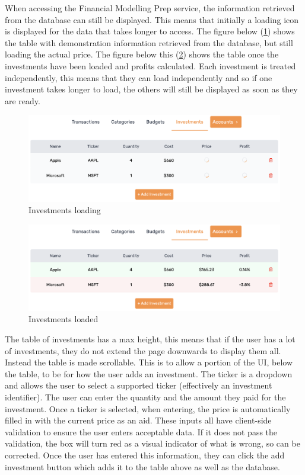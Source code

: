 When accessing the Financial Modelling Prep service, the information retrieved from the database can still be displayed. This means that initially a loading icon is displayed for the data that takes longer to access. The figure below (\ref{fig:InvestmentsLoading}) shows the table with demonstration information retrieved from the database, but still loading the actual price. The figure below this (\ref{fig:InvestmentsLoaded}) shows the table once the investments have been loaded and profits calculated. Each investment is treated independently, this means that they can load independently and so if one investment takes longer to load, the others will still be displayed as soon as they are ready.

\begin{figure}[H]
	\centering
	\includegraphics[width=\textwidth]{images/Investments_loading.png}
	\caption{Investments loading}
	\label{fig:InvestmentsLoading}
\end{figure}

\begin{figure}[H]
	\centering
	\includegraphics[width=\textwidth]{images/Investments_loaded.png}
	\caption{Investments loaded}
	\label{fig:InvestmentsLoaded}
\end{figure}

The table of investments has a max height, this means that if the user has a lot of investments, they do not extend the page downwards to display them all. Instead the table is made scrollable. This is to allow a portion of the UI, below the table, to be for how the user adds an investment. The ticker is a dropdown and allows the user to select a supported ticker (effectively an investment identifier). The user can enter the quantity and the amount they paid for the investment. Once a ticker is selected, when entering, the price is automatically filled in with the current price as an aid. These inputs all have client-side validation to ensure the user enters acceptable data. If it does not pass the validation, the box will turn red as a visual indicator of what is wrong, so can be corrected. Once the user has entered this information, they can click the add investment button which adds it to the table above as well as the database.

